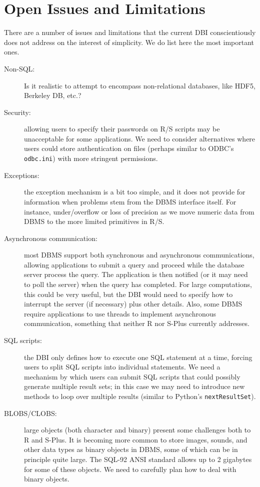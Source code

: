 \documentclass[graphics,times,psfig,dvips,hyper]{article}
\begin{document}
\section{Open Issues and Limitations}\label{sec:open-issues}
There are a number of issues and limitations that the current
DBI conscientiously does not address on the interest of simplicity.
We do list here the most important ones.
\begin{description}
\item[Non-SQL:]
  Is it realistic to attempt to encompass non-relational databases,
  like HDF5, Berkeley DB, etc.?

\item[Security:] 
  allowing users to specify their passwords on R/S scripts may
  be unacceptable for some applications.  We need to consider
  alternatives where users could store authentication on files
  (perhaps similar to ODBC's \texttt{odbc.ini}) with more stringent 
  permissions.

\item[Exceptions:]
  the exception mechanism is a bit too simple, and it does not
  provide for information when problems stem from the DBMS
  interface itself.  For instance, under/overflow or loss of
  precision as we move numeric data from DBMS to the more limited
  primitives in R/S.

\item[Asynchronous communication:]
  most DBMS support both synchronous and asynchronous communications,
  allowing applications to submit a query and proceed while
  the database server process the query. The application is then
  notified (or it may need to poll the server) when the query has completed.
  For large computations, this could be very useful, but the DBI
  would need to specify how to interrupt the server (if necessary)
  plus other details.  Also, some DBMS require applications to use
  threads to implement asynchronous communication, something that
  neither R nor S-Plus currently addresses.

\item[SQL scripts:]
  the DBI only defines how to execute one SQL statement at a time, 
  forcing users to split SQL scripts into individual statements.
  We need a mechanism by which users can submit SQL scripts that
  could possibly generate multiple result sets;  in this case we 
  may need to introduce new methods to loop over multiple results
  (similar to Python's \texttt{nextResultSet}).

\item[BLOBS/CLOBS:]
  large objects (both character and binary) present some challenges both
  to R and S-Plus.  It is becoming more common to store images, sounds,
  and other data types as binary objects in DBMS, some of which can
  be in principle quite large. The SQL-92 ANSI standard allows up
  to 2 gigabytes for some of these objects.  We need to carefully
  plan how to deal with binary objects.
  

\end{description}
\end{document}
